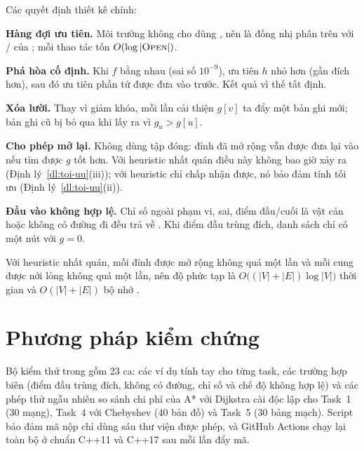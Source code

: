 Các quyết định thiết kế chính:
\begin{dssao}
  \item \textbf{Hàng đợi ưu tiên.} Môi trường không cho dùng , nên \OPEN{} là đống
        nhị phân trên  với / của
        ; mỗi thao tác tốn $O(\log |\textsc{Open}|)$.
  \item \textbf{Phá hòa cố định.} Khi $f$ bằng nhau (sai số $10^{-9}$), ưu tiên $h$ nhỏ hơn
        (gần đích hơn), sau đó ưu tiên phần tử được đưa vào trước. Kết quả vì thế tất định.
  \item \textbf{Xóa lười.} Thay vì giảm khóa, mỗi lần cải thiện $g[v]$ ta đẩy một bản ghi mới;
        bản ghi cũ bị bỏ qua khi lấy ra vì $g_u > g[u]$.
  \item \textbf{Cho phép mở lại.} Không dùng tập đóng: đỉnh đã mở rộng vẫn được đưa lại vào
        \OPEN{} nếu tìm được $g$ tốt hơn. Với heuristic nhất quán điều này không bao giờ xảy ra
        (Định lý~\ref{dl:toi-uu}(iii)); với heuristic chỉ chấp nhận được, nó bảo đảm tính tối ưu
        (Định lý~\ref{dl:toi-uu}(ii)).
  \item \textbf{Đầu vào không hợp lệ.} Chỉ số ngoài phạm vi,  sai, điểm đầu/cuối là
        vật cản hoặc không có đường đi đều trả về . Khi điểm đầu trùng đích, danh
        sách chỉ có một nút với $g = 0$.
\end{dssao}

Với heuristic nhất quán, mỗi đỉnh được mở rộng không quá một lần và mỗi cung được nới lỏng
không quá một lần, nên độ phức tạp là $O\big((|V| + |E|)\log |V|\big)$ thời gian và
$O(|V| + |E|)$ bộ nhớ \cite{cormen2022}.

\section{Phương pháp kiểm chứng}
\label{sec:kiem-chung}

Bộ kiểm thử trong  gồm 23 ca: các ví dụ tính tay cho từng task, các trường hợp biên
(điểm đầu trùng đích, không có đường, chỉ số và chế độ không hợp lệ) và các phép thử ngẫu nhiên
so sánh chi phí của A* với Dijkstra cài độc lập cho Task~1 (30 mạng), Task~4 với Chebyshev
(40 bản đồ) và Task~5 (30 bảng mạch). Script  bảo đảm mã nộp chỉ dùng sáu
thư viện được phép, và GitHub Actions chạy lại toàn bộ ở chuẩn C++11 và C++17 sau mỗi lần đẩy mã.
